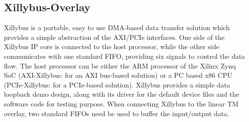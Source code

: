 

\subsection{Xillybus-Overlay}
Xillybus is a portable, easy to use DMA-based data transfer solution which provides a simple abstraction of the AXI/PCIe interfaces. 
One side of the Xillybus IP core is connected to the host processor, while the other side communicates with one standard FIFO, providing six signals to control the data flow. 
The host processor can be either the ARM processor of the Xilinx Zynq SoC (AXI-Xillybus: for an AXI bus-based solution) or a PC based x86 CPU (PCIe-Xillybus: for a PCIe-based solution). 
Xillybus provides a simple data loopback demo design, along with its driver for the default device files and the software code for testing purpose. 
When connecting Xillybus to the linear TM overlay, two standard FIFOs need be used to buffer the input/output data. 




